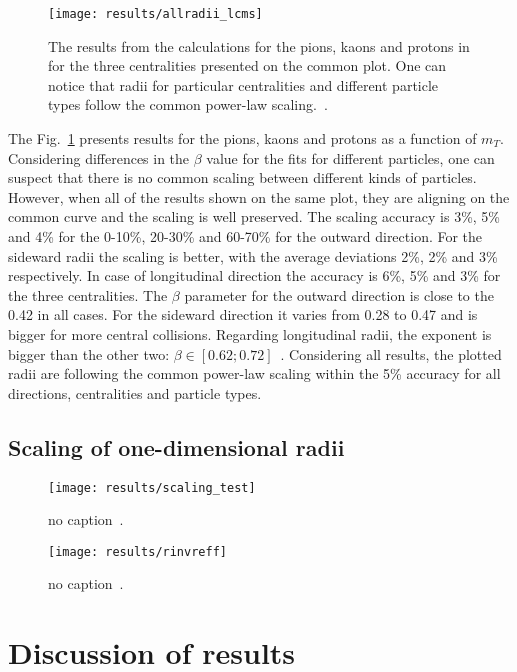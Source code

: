       \begin{figure}[b]
        \centering
        \centerline{\texttt{[image: results/allradii\_lcms]}}
        \caption{The results from the calculations for the pions, kaons and protons in for the three centralities presented on the common plot. One can notice that radii for particular centralities and different particle types follow the common power-law scaling.~\cite{galazyn}.}
      \label{fig:allradii}
      \end{figure}    

      The Fig.~\ref{fig:allradii} presents results for the pions, kaons and protons as a function of $m_T$.
      Considering differences in the $\beta$ value for the fits for different particles, one can suspect that there is no common scaling between different kinds of particles.
      However, when all of the results shown on the same plot, they are aligning on the common curve and the scaling is well preserved.
      The scaling accuracy is 3\%, 5\% and 4\% for the 0-10\%, 20-30\% and 60-70\% for the outward direction.
      For the sideward radii the scaling is better, with the average deviations 2\%, 2\% and 3\% respectively.
      In case of longitudinal direction the accuracy is 6\%, 5\% and 3\% for the three centralities.
      The $\beta$ parameter for the outward direction is close to the 0.42 in all cases.
      For the sideward direction it varies from 0.28 to 0.47 and is bigger for more central collisions.
      Regarding longitudinal radii, the exponent is bigger than the other two: $\beta \in [0.62 ; 0.72]$~.
      Considering all results, the plotted radii are following the common power-law scaling within the 5\% accuracy for all directions, centralities and particle types.
      \FloatBarrier
      \subsection{Scaling of one-dimensional radii}
      \begin{figure}[b]
        \centering
        \centerline{\texttt{[image: results/scaling\_test]}}
        \caption{no caption~\cite{galazyn}.}
      \label{fig:scaling_test}
      \end{figure}    

      \begin{figure}[b]
        \centering
        \centerline{\texttt{[image: results/rinvreff]}}
        \caption{no caption~\cite{galazyn}.}
      \label{fig:rinveff}
      \end{figure}


      \FloatBarrier
  \section{Discussion of results}

